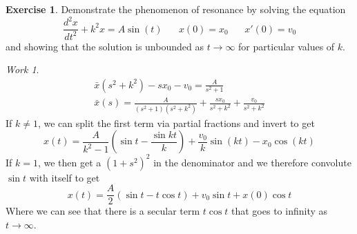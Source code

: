 \documentclass{report}
\theoremstyle{definition}
\newtheorem{exercise}{Exercise}[chapter]
\theoremstyle{remark}
\newtheorem*{work}{Work}
\newcommand{\twen}{\hspace{20pt}}
\newcommand{\odt}[2]{\frac{d^2 #1}{d#2^2}}
\begin{document}
\begin{exercise}
    Demonstrate the phenomenon of resonance by solving the equation
    \begin{equation*}
        \odt{x}{t} + k^2x=A\sin(t) \twen x(0)=x_0 \twen x'(0)=v_0
    \end{equation*}
    and showing that the solution is unbounded as $t\rightarrow \infty$ for particular values of $k$.
\end{exercise}
\begin{work}
    \begin{equation*}
        \begin{split}
            \bar x(s^2+k^2)-sx_0-v_0=\frac{A}{s^2+1}\\
            \bar x(s)=\frac{A}{(s^2+1)(s^2+k^2)} + \frac{sx_0}{s^2+k^2}+\frac{v_0}{s^2+k^2}
        \end{split}
    \end{equation*}
    If $k\neq 1$, we can split the first term via partial fractions and invert to get 
    \begin{equation*}
        x(t) = \frac{A}{k^2-1}\left(\sin t-\frac{\sin kt}{k}\right) + \frac{v_0}{k}\sin(kt) -x_0\cos(kt)
    \end{equation*}
    If $k=1$, we then get a $(1+s^2)^2$ in the denominator and we therefore convolute $\sin t$ with itself to get 
    \begin{equation*}
        x(t)= \frac{A}{2}(\sin t-t\cos t)+v_0\sin t+x(0)\cos t
    \end{equation*}
    Where we can see that there is a secular term $t\cos t$ that goes to infinity as $t\rightarrow \infty$.
\end{work}
\end{document}
